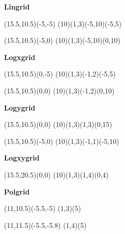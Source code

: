 


\begin{center}
{\Huge\bf{Lingrid}}
\bigskip

\begin{lapdf}(15.5,10.5)(-5,-5)
 \Lingrid(10)(1,3)(-5,10)(-5,5)
\end{lapdf}
\bigskip

\begin{lapdf}(15.5,10.5)(-5,0)
 \Lingrid(10)(1,3)(-5,10)(0,10)
\end{lapdf}

\newpage

{\Huge\bf{Logxgrid}}
\bigskip

\begin{lapdf}(15.5,10.5)(0,-5)
 \Logxgrid(10)(1,3)(-1,2)(-5,5)
\end{lapdf}
\bigskip

\begin{lapdf}(15.5,10.5)(0,0)
 \Logxgrid(10)(1,3)(-1,2)(0,10)
\end{lapdf}

\newpage

{\Huge\bf{Logygrid}}
\bigskip

\begin{lapdf}(15.5,10.5)(0,0)
 \Logygrid(10)(1,3)(1,3)(0,15)
\end{lapdf}
\bigskip

\begin{lapdf}(15.5,10.5)(-5,0)
 \Logygrid(10)(1,3)(-1,1)(-5,10)
\end{lapdf}

\newpage

{\Huge\bf{Logxygrid}}
\bigskip

\begin{lapdf}(15.5,20.5)(0,0)
 \Logxygrid(10)(1,3)(1,4)(0,4)
\end{lapdf}

\newpage

{\Huge\bf{Polgrid}}
\bigskip

\begin{lapdf}(11,10.5)(-5.5,-5)
 \Polgrid(1,3)(5)
\end{lapdf}
\bigskip

\begin{lapdf}(11,11.5)(-5.5,-5.8)
 \Polgrid(1,4)(5)
\end{lapdf}
\end{center}

